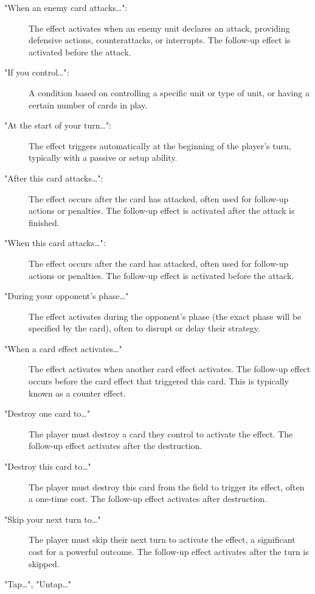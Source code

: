 \begin{description}
	\item["When an enemy card attacks\dots":] The effect activates when an enemy unit declares an attack, providing defensive actions, counterattacks, or interrupts. The follow-up effect is activated before the attack.
	\item["If you control\dots":] A condition based on controlling a specific unit or type of unit, or having a certain number of cards in play.
	\item["At the start of your turn\dots":] The effect triggers automatically at the beginning of the player's turn, typically with a passive or setup ability.
	\item["After this card attacks\dots":] The effect occurs after the card has attacked, often used for follow-up actions or penalties. The follow-up effect is activated after the attack is finished.
	\item["When this card attacks\dots":] The effect occurs after the card has attacked, often used for follow-up actions or penalties. The follow-up effect is activated before the attack.
	\item["During your opponent's phase\dots"]  The effect activates during the opponent's phase (the exact phase will be specified by the card), often to disrupt or delay their strategy.
	\item["When a card effect activates\dots"] The effect activates when another card effect activates. The follow-up effect occurs before the card effect that triggered this card. This is typically known as a counter effect.
	\item["Destroy one card to\dots"] The player must destroy a card they control to activate the effect. The follow-up effect activates after the destruction.
	\item["Destroy this card to\dots"] The player must destroy this card from the field to trigger its effect, often a one-time cost. The follow-up effect activates after destruction.
	\item["Skip your next turn to\dots"] The player must skip their next turn to activate the effect, a significant cost for a powerful outcome. The follow-up effect activates after the turn is skipped.
	\item["Tap\dots", "Untap\dots" ]
\end{description}

    

  
  


